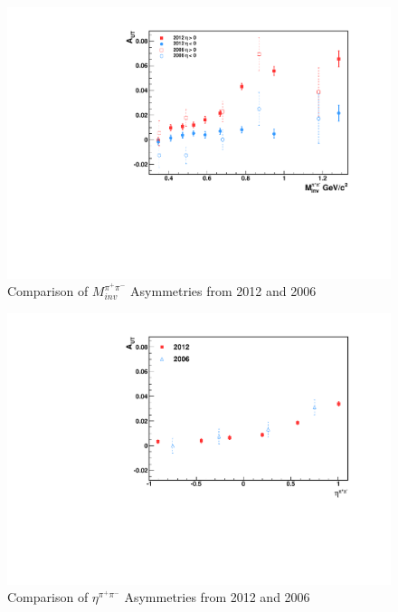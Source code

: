 \documentclass[letterpaper, abstract = on,listof=totoc, bibliography=totoc]{scrreprt}
\newcommand{\mpair}{M_{inv}^{\pi^+\pi^-}}
\newcommand{\etapair}{\eta^{\pi^+\pi^-}}
\begin{document}
\begin{figure}
\begin{center}
\includegraphics[width = .7\textwidth]{AutVM0612_difMark}
\caption[$\mpair$ Asymmetries 2012 and 2006]{Comparison of $\mpair$ Asymmetries from 2012 and 2006}
\label{fig:compMass}
\end{center}
\end{figure}

\begin{figure}
\begin{center}
\includegraphics[width = .7\textwidth]{asymsHiLoAnselm_Eta_8_24_15}
\caption[$\etapair$ Asymmetries 2012 and 2006]{Comparison of $\etapair$ Asymmetries from 2012 and 2006}
\label{fig:compEta}
\end{center}
\end{figure}
\end{document}
